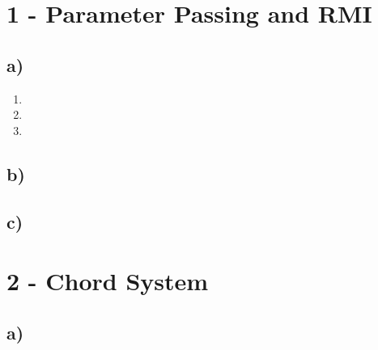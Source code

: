 \documentclass{scrartcl}
\author{Felix Bühler\\2973410 \and Clemens Lieb\\3130838 \and Steffen Wonner\\2862123 \and Fabian Bühler\\2953320}
\title{\gettitle}
\subtitle{\getsubtitle}
\begin{document}
\maketitle

\section*{1 - Parameter Passing and RMI}
\subsection*{a)}
\begin{enumerate}[label=(\roman*)]
	\item 
	\item 
	\item 
\end{enumerate}

\subsection*{b)}

\subsection*{c)}


\section*{2 - Chord System}
\subsection*{a)}
\end{document}
